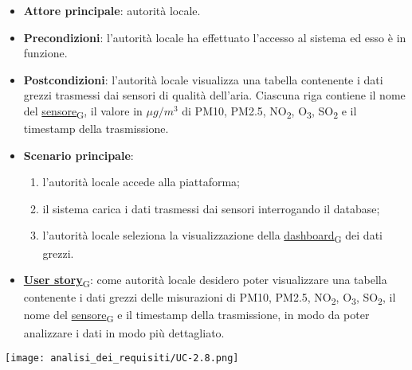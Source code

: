\begin{itemize}
	\item \textbf{Attore principale}: autorità locale.
	\item \textbf{Precondizioni}: l'autorità locale ha effettuato l'accesso al sistema ed esso è in funzione.
	\item \textbf{Postcondizioni}: l'autorità locale visualizza una tabella contenente i dati grezzi trasmessi dai sensori di qualità dell'aria.
	      Ciascuna riga contiene il nome del \href{https://7last.github.io/docs/pb/documentazione-interna/glossario\#sensore}{sensore\textsubscript{G}}, il valore in $\mu g/m^3$ di PM10, PM2.5, NO\textsubscript{2}, O\textsubscript{3}, SO\textsubscript{2} e il timestamp della trasmissione.
	\item \textbf{Scenario principale}:
	      \begin{enumerate}
		      \item l'autorità locale accede alla piattaforma;
		      \item il sistema carica i dati trasmessi dai sensori interrogando il database;
		      \item l'autorità locale seleziona la visualizzazione della \href{https://7last.github.io/docs/pb/documentazione-interna/glossario\#dashboard}{dashboard\textsubscript{G}} dei dati grezzi.
	      \end{enumerate}
	\item \href{https://7last.github.io/docs/pb/documentazione-interna/glossario\#user-story}{\textbf{User story}\textsubscript{G}}:
	      come autorità locale desidero poter visualizzare una tabella contenente i dati grezzi delle misurazioni di PM10, PM2.5, NO\textsubscript{2}, O\textsubscript{3}, SO\textsubscript{2},
	      il nome del \href{https://7last.github.io/docs/pb/documentazione-interna/glossario\#sensore}{sensore\textsubscript{G}} e il timestamp della trasmissione, in modo da poter analizzare i dati in modo più dettagliato.
\end{itemize}
\begin{center}
	\texttt{[image: analisi\_dei\_requisiti/UC-2.8.png]}
\end{center}


